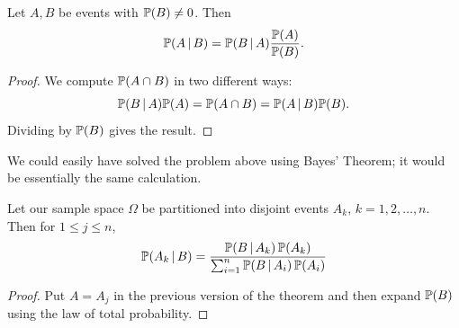 \begin{thm}
Let $A,B$ be events with ${\mathbb P}(B)\not= 0$. Then 
\[
    {\mathbb P}( A \, | \, B) = {\mathbb P}( B \, | \, A) \frac{{\mathbb P}(A)}{{\mathbb P}(B)}.
 \]
\end{thm}
\begin{proof}
We compute ${\mathbb P}(A \cap B)$ in two different ways: 
 \[ 
 {\mathbb P}(B \, | \, A) {\mathbb P}(A) = {\mathbb P}(A \cap B) = {\mathbb P}(A \, | \, B) {\mathbb P}(B). 
 \]
Dividing by ${\mathbb P}(B)$ gives the result. 
\end{proof}
We could easily have solved the problem above using Bayes' Theorem; it would be essentially the same calculation. 
\begin{thm}
Let our sample space $\Omega$ be partitioned into disjoint events $A_k, \, k=1,2,\dots, n$.  Then for $1\leq j \leq n$, 
\[
   {\mathbb P}(A_k \, | \, B)  =   \frac{{\mathbb P}(B \, | \, A_k)\,{\mathbb P}(A_k)}{ \sum_{i=1}^n {\mathbb P}(B \, | \, A_i) \,{\mathbb P}(A_i)}
 \]
\end{thm}
\begin{proof}
Put $A=A_j$ in the previous version of the theorem and then expand ${\mathbb P}(B)$ using the law of total probability.
\end{proof}

